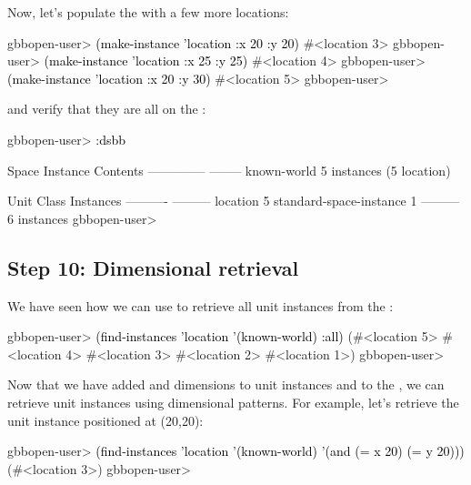\documentclass[10pt,twoside,english,pdftex]{article}
\begin{document}
%
%
Now, let's populate the  with a few more locations:
%
\W\supp
\begin{example}
\textcolor{darkergray}{%
  gbbopen-user> \textcolor{black}{(make-instance 'location :x 20 :y 20)}
  #<location 3>
  gbbopen-user> \textcolor{black}{(make-instance 'location :x 25 :y 25)}
  #<location 4>
  gbbopen-user> \textcolor{black}{(make-instance 'location :x 20 :y 30)}
  #<location 5>
  gbbopen-user>}
\end{example}
%
%
%
and verify that they are all on the :
%
\W\supp\notpretop
\begin{example}
\textcolor{darkergray}{%
  gbbopen-user> \textcolor{black}{:dsbb}
  
  Space Instance                Contents
  --------------                --------
  known-world                   5 instances (5 location)

  Unit Class                    Instances
  ----------                    ---------
  location                              5
  standard-space-instance               1
                                ---------
                                        6 instances
  gbbopen-user>}
\end{example}

\subsection*{Step 10: Dimensional retrieval}

%
%
We have seen how we can use  to retrieve all
 unit instances from the :
%
\W\supp
\begin{example}
\textcolor{darkergray}{%
  gbbopen-user> \textcolor{black}{(find-instances 'location '(known-world) :all)}
  (#<location 5> #<location 4> #<location 3> #<location 2> #<location 1>)
  gbbopen-user>}
\end{example}

Now that we have added  and  dimensions to
 unit instances and to the , we
can retrieve  unit instances using dimensional patterns.
For example, let's retrieve the unit instance positioned at (20,20):
%
\W\supp
\begin{example}
\textcolor{darkergray}{%
  gbbopen-user> \textcolor{black}{(find-instances 'location '(known-world)
                  '(and (= x 20) (= y 20)))}
   (#<location 3>)
  gbbopen-user>}
\end{example}
\end{document}
